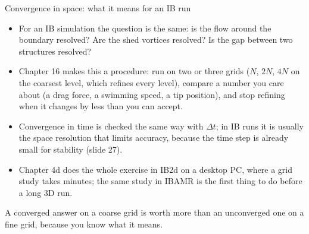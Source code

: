 \documentclass[aspectratio=169,11pt]{beamer}
\begin{document}
\begin{frame}{Convergence in space: what it means for an IB run}
\begin{itemize}
  \item For an IB simulation the question is the same: is the flow around the boundary resolved? Are the shed vortices resolved? Is the gap between two structures resolved?
  \item Chapter 16 makes this a procedure: run on two or three grids ($N$, $2N$, $4N$ on the coarsest level, which refines every level), compare a number you care about (a drag force, a swimming speed, a tip position), and stop refining when it changes by less than you can accept.
  \item Convergence in time is checked the same way with $\Delta t$; in IB runs it is usually the space resolution that limits accuracy, because the time step is already small for stability (slide 27).
  \item Chapter 4d does the whole exercise in IB2d on a desktop PC, where a grid study takes minutes; the same study in IBAMR is the first thing to do before a long 3D run.
\end{itemize}
\vspace{2mm}
\begin{punchbox}
\small A converged answer on a coarse grid is worth more than an unconverged one on a fine grid, because you know what it means.
\end{punchbox}
\end{frame}
\end{document}
